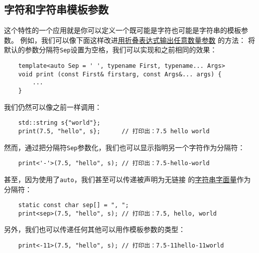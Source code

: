 \subsection{字符和字符串模板参数}\label{ch13.1.1}
这个特性的一个应用就是你可以定义一个既可能是字符也可能是字符串的模板参数。
例如，我们可以像下面这样改进\hyperref[输出任意个参数的print]{用折叠表达式输出任意数量参数}
的方法：
将默认的参数分隔符\texttt{Sep}设置为空格，我们可以实现和之前相同的效果：
\begin{lstlisting}
    template<auto Sep = ' ', typename First, typename... Args>
    void print (const First& firstarg, const Args&... args) {
        ...
    }
\end{lstlisting}
我们仍然可以像之前一样调用：
\begin{lstlisting}
    std::string s{"world"};
    print(7.5, "hello", s};      // 打印出：7.5 hello world
\end{lstlisting}
然而，通过把分隔符\texttt{Sep}参数化，我们也可以显示指明另一个字符作为分隔符：
\begin{lstlisting}
    print<'-'>(7.5, "hello", s); // 打印出：7.5-hello-world
\end{lstlisting}
甚至，因为使用了\texttt{auto}，我们甚至可以传递被声明为无链接
的\hyperref[ch12]{字符串字面量}作为分隔符：
\begin{lstlisting}
    static const char sep[] = ", ";
    print<sep>(7.5, "hello", s); // 打印出：7.5, hello, world
\end{lstlisting}
另外，我们也可以传递任何其他可以用作模板参数的类型：
\begin{lstlisting}
    print<-11>(7.5, "hello", s); // 打印出：7.5-11hello-11world
\end{lstlisting}

